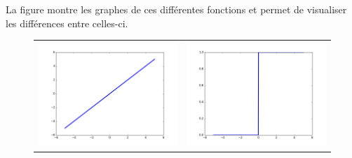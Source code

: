 \documentclass{report}
\begin{document}
La figure \label{fonctions_activation} montre les graphes de ces différentes fonctions et permet de visualiser les différences entre celles-ci.

\begin{figure}
\begin{center}
\begin{tabular}{cc}
\includegraphics[scale=0.25]{images/id.png} & \includegraphics[scale=0.25]{images/u.png} \\

\end{tabular}
\end{center}
\end{figure}
\end{document}
